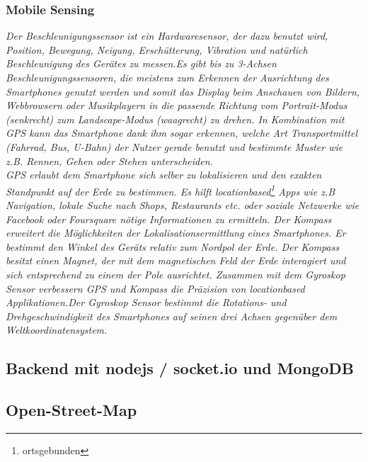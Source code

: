\subsubsection*{Mobile Sensing}
\textit{Der Beschleunigungssensor ist ein Hardwaresensor, der dazu benutzt wird, Position, Bewegung, Neigung, Erschütterung, Vibration und natürlich Beschleunigung des Gerätes zu messen.Es gibt bis zu 3-Achsen Beschleunigungssensoren, die meistens zum Erkennen der Ausrichtung des \glspl{Smartphone} genutzt werden und somit das Display beim Anschauen von Bildern, Webbrowsern oder Musikplayern in die passende Richtung vom Portrait-Modus (senkrecht) zum Landscape-Modus (waagrecht) zu drehen. In Kombination mit \gls{GPS} kann das \gls{Smartphone} dank ihm sogar erkennen, welche Art Transportmittel (Fahrrad, Bus, U-Bahn) der Nutzer gerade benutzt und bestimmte Muster wie z.B. Rennen, Gehen oder Stehen unterscheiden.\\
\gls{GPS} erlaubt dem \gls{Smartphone} sich selber zu lokalisieren und den exakten Standpunkt auf der Erde zu bestimmen. Es hilft locationbased\footnote{ ortsgebunden} \Glspl{App} wie z.B Navigation, lokale Suche nach Shops, Restaurants etc. oder soziale Netzwerke wie Facebook oder Foursquare nötige Informationen zu ermitteln. Der Kompass erweitert die Möglichkeiten der Lokalisationsermittlung eines \gls{Smartphone}s. Er bestimmt den Winkel des Geräts relativ zum Nordpol der Erde. Der Kompass besitzt einen Magnet, der mit dem magnetischen Feld der Erde interagiert und sich entsprechend zu einem der Pole ausrichtet. Zusammen mit dem Gyroskop Sensor verbessern \gls{GPS} und Kompass die Präzision von locationbased Applikationen.Der Gyroskop Sensor bestimmt die Rotations- und Drehgeschwindigkeit des \gls{Smartphone}s auf seinen drei Achsen gegenüber dem Weltkoordinatensystem.}
\subsection{Backend mit nodejs / socket.io und MongoDB}
\subsection{Open-Street-Map}
